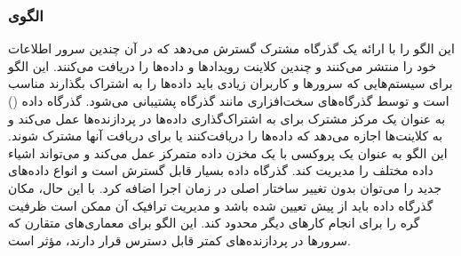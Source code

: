 \subsubsection{الگوی }
\label{distrDataBusSec}
\begin{RTL}
این الگو \cite{ref4}
 را با ارائه یک گذرگاه
مشترک گسترش می‌دهد که در آن چندین سرور اطلاعات خود را منتشر می‌کنند و چندین
کلاینت رویدادها و داده‌ها را دریافت می‌کنند.
این الگو برای سیستم‌هایی که سرورها و کاربران زیادی
باید داده‌ها را به اشتراک بگذارند مناسب است
و توسط گذرگاه‌های سخت‌افزاری مانند گذرگاه  پشتیبانی می‌شود.
گذرگاه داده ()
به عنوان یک مرکز مشترک برای به اشتراک‌گذاری داده‌ها در پردازنده‌ها
عمل می‌کند و به کلاینت‌ها اجازه می‌دهد که داده‌ها
را دریافت‌کنند یا برای دریافت آنها مشترک شوند.
این الگو به عنوان یک پروکسی با یک مخزن داده متمرکز عمل
می‌کند و می‌تواند اشیاء داده مختلف را مدیریت کند.
گذرگاه داده بسیار قابل گسترش است و انواع داده‌های جدید را
می‌توان بدون تغییر ساختار اصلی در زمان اجرا اضافه کرد.
با این حال، مکان گذرگاه داده باید از پیش تعیین شده باشد و مدیریت ترافیک
آن ممکن است ظرفیت گره را برای انجام کارهای دیگر محدود کند.
این الگو برای معماری‌های متقارن که سرورها در پردازنده‌های کمتر قابل
دسترس قرار دارند، مؤثر است.
\end{RTL}
